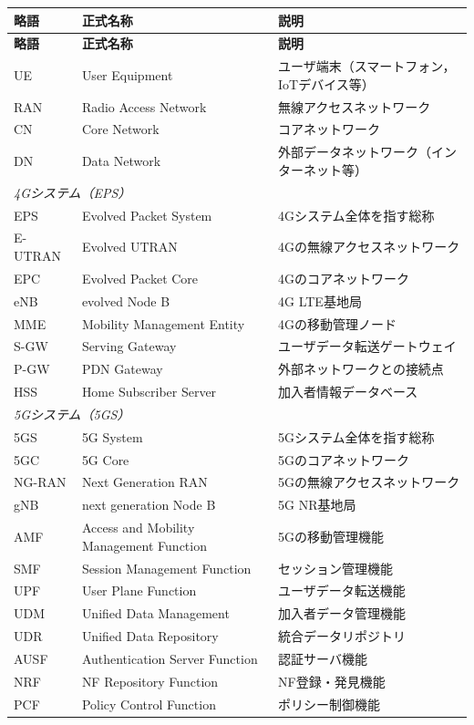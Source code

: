 \begin{longtable}{|p{1.8cm}|p{4.5cm}|p{6.5cm}|}
\hline
\textbf{略語} & \textbf{正式名称} & \textbf{説明} \\
\hline
\endfirsthead
\hline
\textbf{略語} & \textbf{正式名称} & \textbf{説明} \\
\hline
\endhead
\hline
\endfoot
UE & User Equipment & ユーザ端末（スマートフォン，IoTデバイス等） \\
\hline
RAN & Radio Access Network & 無線アクセスネットワーク \\
\hline
CN & Core Network & コアネットワーク \\
\hline
DN & Data Network & 外部データネットワーク（インターネット等） \\
\hline
\multicolumn{3}{|l|}{\textit{4Gシステム（EPS）}} \\
\hline
EPS & Evolved Packet System & 4Gシステム全体を指す総称 \\
\hline
E-UTRAN & Evolved UTRAN & 4Gの無線アクセスネットワーク \\
\hline
EPC & Evolved Packet Core & 4Gのコアネットワーク \\
\hline
eNB & evolved Node B & 4G LTE基地局 \\
\hline
MME & Mobility Management Entity & 4Gの移動管理ノード \\
\hline
S-GW & Serving Gateway & ユーザデータ転送ゲートウェイ \\
\hline
P-GW & PDN Gateway & 外部ネットワークとの接続点 \\
\hline
HSS & Home Subscriber Server & 加入者情報データベース \\
\hline
\multicolumn{3}{|l|}{\textit{5Gシステム（5GS）}} \\
\hline
5GS & 5G System & 5Gシステム全体を指す総称 \\
\hline
5GC & 5G Core & 5Gのコアネットワーク \\
\hline
NG-RAN & Next Generation RAN & 5Gの無線アクセスネットワーク \\
\hline
gNB & next generation Node B & 5G NR基地局 \\
\hline
AMF & Access and Mobility Management Function & 5Gの移動管理機能 \\
\hline
SMF & Session Management Function & セッション管理機能 \\
\hline
UPF & User Plane Function & ユーザデータ転送機能 \\
\hline
UDM & Unified Data Management & 加入者データ管理機能 \\
\hline
UDR & Unified Data Repository & 統合データリポジトリ \\
\hline
AUSF & Authentication Server Function & 認証サーバ機能 \\
\hline
NRF & NF Repository Function & NF登録・発見機能 \\
\hline
PCF & Policy Control Function & ポリシー制御機能 \\
\hline
\end{longtable}

